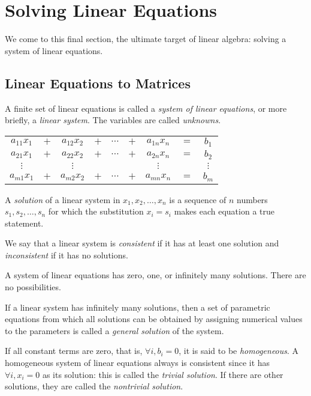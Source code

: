 \documentclass{report}
\begin{document}
	\section{Solving Linear Equations}
	We come to this final section, the ultimate target of linear algebra: solving a system of linear equations.
		\subsection{Linear Equations to Matrices}
		A finite set of linear equations is called a \emph{system of linear equations}, or more briefly, a \emph{linear system}. The variables are called \emph{unknowns}.
		
		\begin{center}
			\begin{tabular}{ccccccccc}
				$a_{11}x_1$ & $+$ & $a_{12}x_2$ & $+$ & $\cdots$ & $+$ & $a_{1n}x_n$ & $=$ & $b_1$    \\
				$a_{21}x_1$ & $+$ & $a_{22}x_2$ & $+$ & $\cdots$ & $+$ & $a_{2n}x_n$ & $=$ & $b_2$    \\
				$\vdots$    &     & $\vdots$   &     &          &     & $\vdots$    &     & $\vdots$ \\
				$a_{m1}x_1$ & $+$ & $a_{m2}x_2$ & $+$ & $\cdots$ & $+$ & $a_{mn}x_n$ & $=$ & $b_m$   
			\end{tabular}
		\end{center}
		
		A \emph{solution} of a linear system in $x_1,x_2,\dots,x_n$ is a sequence of $n$ numbers $s_1,s_2,\dots,s_n$ for which the substitution $x_i=s_i$ makes each equation a true statement.
		
		We say that a linear system is \emph{consistent} if it has at least one solution and \emph{inconsistent} if it has no solutions.
		
		\begin{thm}
			A system of linear equations has zero, one, or infinitely many solutions. There are no possibilities.
		\end{thm}
		
		If a linear system has infinitely many solutions, then a set of parametric equations from which all solutions can be obtained by assigning numerical values to the parameters is called a \emph{general solution} of the system.
		
		If all constant terms are zero, that is, $\forall i, b_i=0$, it is said to be \emph{homogeneous}. A homogeneous system of linear equations always is consistent since it has $\forall i, x_i=0$ as its solution: this is called the \emph{trivial solution}. If there are other solutions, they are called the \emph{nontrivial solution}.
		
\end{document}
